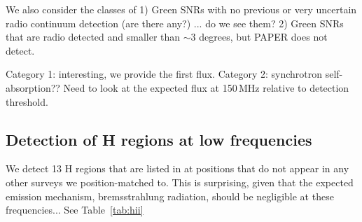 \documentclass[useAMS,usenatbib]{mn2e}
\begin{document}
We also consider the classes of 1) Green SNRs with no previous or very
uncertain radio continuum detection (are there any?) ... do we see
them?  2) Green SNRs that are radio detected and smaller than $\sim3$
degrees, but PAPER does not detect.

Category 1: interesting, we provide the first flux.  Category 2:
synchrotron self-absorption??  Need to look at the expected flux at
150\,MHz relative to detection threshold.  

\subsection{Detection of {H} regions at low frequencies}
We detect 13 {H} regions that are listed in \cite{Paladini.03} at positions that do not appear in any other surveys we position-matched to. This is surprising, given that the expected emission mechanism, bremsstrahlung radiation, should be negligible at these frequencies... See Table~\ref{tab:hii}
\end{document}
